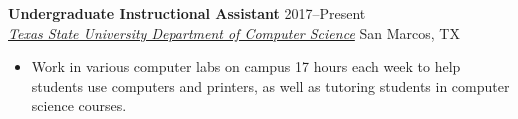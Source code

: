 \documentclass[10pt]{article}
\newcommand{\ressubheading}[4]{
    \textbf{#1} \hfill #2 \\[0pt]
    \textit{#3} \hfill #4 \\[0pt]
}
\newenvironment{resitemize}{
    \vspace{-6pt}
    \begin{itemize}
    \setlength\itemsep{-2pt}
}{
    \end{itemize}
}
\begin{document}
\begin{NoHyper}
\ressubheading
	{Undergraduate Instructional Assistant}
	{2017--Present}
	{\href{https://cs.txstate.edu/accounts/lab_assistants/}{Texas State University Department of Computer Science}}
	{San Marcos, TX}
    \begin{resitemize}
        \item Work in various computer labs on campus 17 hours each week to help students use computers and printers, as well as tutoring students in computer science courses.
    \end{resitemize}

    

\end{NoHyper}
\end{document}
